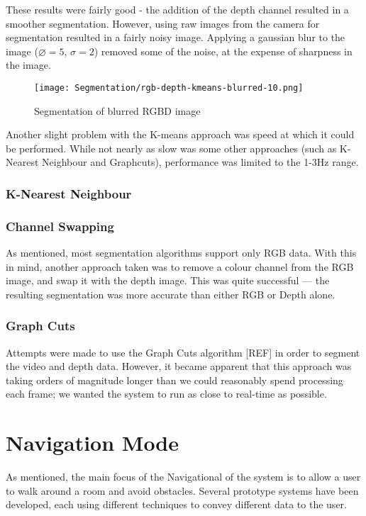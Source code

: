 These results were fairly good - the addition of the depth channel resulted in a smoother segmentation. However, using raw images from the camera for segmentation resulted in a fairly noisy image. Applying a gaussian blur to the image ($\diameter = 5$, $\sigma = 2$) removed some of the noise, at the expense of sharpness in the image.

\begin{figure}[H]
    \centering
    \texttt{[image: Segmentation/rgb-depth-kmeans-blurred-10.png]}
    \caption{Segmentation of blurred RGBD image}
\end{figure}

Another slight problem with the K-means approach was speed at which it could be performed. While not nearly as slow was some other approaches (such as K-Nearest Neighbour and Graphcuts), performance was limited to the 1-3Hz range.

\subsubsection{K-Nearest Neighbour}


\subsubsection{Channel Swapping}
As mentioned, most segmentation algorithms support only RGB data. With this in mind, another approach taken was to remove a colour channel from the RGB image, and swap it with the depth image. This was quite successful --- the resulting segmentation was more accurate than either RGB or Depth alone.

\subsubsection{Graph Cuts}
Attempts were made to use the Graph Cuts algorithm [REF] in order to segment the video and depth data. However, it became apparent that this approach was taking orders of magnitude longer than we could reasonably spend processing each frame; we wanted the system to run as close to real-time as possible.





\section{Navigation Mode}
\label{sec:nav}
As mentioned, the main focus of the Navigational of the system is to allow a user to walk around a room and avoid obstacles. Several prototype systems have been developed, each using different techniques to convey different data to the user.

